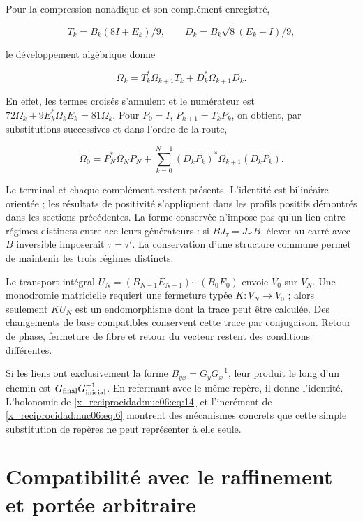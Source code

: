Pour la compression nonadique et son complément enregistré,

\[
T_k=B_k(8I+E_k)/9,\qquad
D_k=B_k\sqrt8(E_k-I)/9,
\]

le développement algébrique donne

\begin{equation}
\Omega_k=T_k^*\Omega_{k+1}T_k+D_k^*\Omega_{k+1}D_k.
\label{x_reciprocidad:nuc06:eq:17}
\end{equation}

En effet, les termes croisés s’annulent et le numérateur est \(72\Omega_k+9E_k^*\Omega_kE_k=81\Omega_k\). Pour \(P_0=I\), \(P_{k+1}=T_kP_k\), on obtient, par substitutions successives et dans l’ordre de la route,

\begin{equation}
\boxed{\quad
\Omega_0=P_N^*\Omega_NP_N+
\sum_{k=0}^{N-1}(D_kP_k)^*\Omega_{k+1}(D_kP_k).
\quad}
\label{x_reciprocidad:nuc06:eq:18}
\end{equation}

Le terminal et chaque complément restent présents. L’identité est bilinéaire orientée ; les résultats de positivité s’appliquent dans les profils positifs démontrés dans les sections précédentes. La forme conservée n’impose pas qu’un lien entre régimes distincts entrelace leurs générateurs : si \(BJ_\tau=J_{\tau'}B\), élever au carré avec \(B\) inversible imposerait \(\tau=\tau'\). La conservation d’une structure commune permet de maintenir les trois régimes distincts.

Le transport intégral \(U_N=(B_{N-1}E_{N-1})\cdots(B_0E_0)\) envoie \(V_0\) sur \(V_N\). Une monodromie matricielle requiert une fermeture typée \(K:V_N\to V_0\) ; alors seulement \(KU_N\) est un endomorphisme dont la trace peut être calculée. Des changements de base compatibles conservent cette trace par conjugaison. Retour de phase, fermeture de fibre et retour du vecteur restent des conditions différentes.

Si les liens ont exclusivement la forme \(B_{yx}=G_yG_x^{-1}\), leur produit le long d’un chemin est \(G_{\rm final}G_{\rm inicial}^{-1}\). En refermant avec le même repère, il donne l’identité. L’holonomie de \eqref{x_reciprocidad:nuc06:eq:14} et l’incrément de \eqref{x_reciprocidad:nuc06:eq:6} montrent des mécanismes concrets que cette simple substitution de repères ne peut représenter à elle seule.

\section{Compatibilité avec le raffinement et portée arbitraire}

